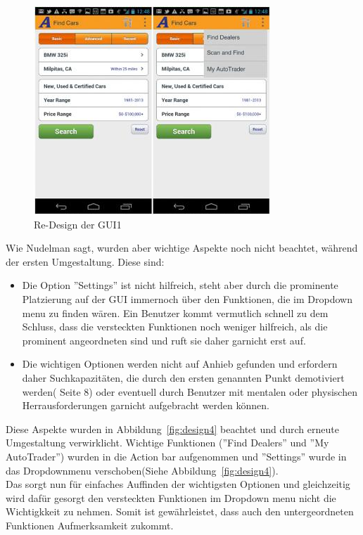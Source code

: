 \begin{figure}[!h]
 \centering
 \includegraphics[height=0.40\textheight]{img/Design3.png}
 \caption{Re-Design der GUI1}
 \label{fig:design3}
\end{figure}

Wie Nudelman sagt, wurden aber wichtige Aspekte noch nicht beachtet, während der ersten Umgestaltung. Diese sind:
\begin{itemize}
\item Die Option ''Settings'' ist nicht hilfreich, steht aber durch die prominente Platzierung auf der GUI immernoch über den Funktionen, die im Dropdown menu zu finden wären. Ein Benutzer kommt vermutlich schnell zu dem Schluss, dass die versteckten Funktionen noch weniger hilfreich, als die prominent angeordneten sind und ruft sie daher garnicht erst auf.\\
\item Die wichtigen Optionen werden nicht auf Anhieb gefunden und erfordern daher Suchkapazitäten, die durch den ersten genannten Punkt demotiviert werden(\cite{AndroidDesignPatterns} Seite 8) oder eventuell durch Benutzer mit mentalen oder physischen Herrausforderungen garnicht aufgebracht werden können.\\
\end{itemize}

Diese Aspekte wurden in Abbildung~\ref{fig:design4} beachtet und durch erneute Umgestaltung verwirklicht. Wichtige Funktionen (''Find Dealers'' und ''My AutoTrader'') wurden in die Action bar aufgenommen und ''Settings'' wurde in das Dropdownmenu verschoben(Siehe Abbildung~\ref{fig:design4}).\\

Das sorgt nun für einfaches Auffinden der wichtigsten Optionen und gleichzeitig wird dafür gesorgt den versteckten Funktionen im Dropdown menu nicht die Wichtigkkeit zu nehmen. Somit ist gewährleistet, dass auch den untergeordneten Funktionen Aufmerksamkeit zukommt.\\

